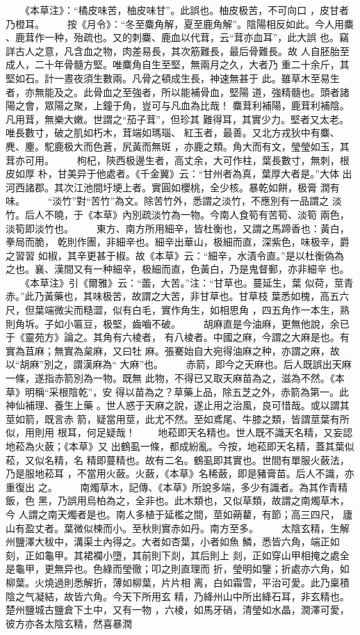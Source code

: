 \documentclass{ctexart}
\begin{document}
　　《本草注》：``橘皮味苦，柚皮味甘''。此誤也。柚皮极苦，不可向口 ，皮甘者乃橙耳。 　　按《月令》：``冬至麋角解，夏至鹿角解''。陰陽相反如此。今人用麋 、鹿茸作一种，殆疏也。又的刺麋、鹿血以代茸，云``茸亦血耳''，此大誤 也。竊詳古人之意，凡含血之物，肉差易長，其次筋難長，最后骨難長。故 人自胚胎至成人，二十年骨髓方堅。唯麋角自生至堅，無兩月之久，大者乃 重二十余斤，其堅如石。計一晝夜須生數兩。凡骨之頓成生長，神速無甚于 此。雖草木至易生者，亦無能及之。此骨血之至強者，所以能補骨血，堅陽 道，強精髓也。頭者諸陽之會，眾陽之聚，上鐘于角，豈可与凡血為比哉！ 麋茸利補陽，鹿茸利補陰。凡用茸，無樂大嫩。世謂之``茄子茸''，但珍其 難得耳，其實少力。堅者又太老。唯長數寸，破之肌如朽木，茸端如瑪瑙、 紅玉者，最善。又北方戎狄中有麋、麂、麈。駝鹿极大而色蒼，尻黃而無斑 ，亦鹿之類。角大而有文，瑩瑩如玉，其茸亦可用。 　　枸杞，陝西极邊生者，高丈余，大可作柱，葉長數寸，無刺，根皮如厚 朴，甘美异于他處者。《千金翼》云：``甘州者為真，葉厚大者是。''大体 出河西諸郡。其次江池間圩埂上者。實圓如櫻桃，全少核。暴乾如餅，极膏 潤有味。 　　``淡竹''對``苦竹''為文。除苦竹外，悉謂之淡竹，不應別有一品謂之 淡竹。后人不曉，于《本草》內別疏淡竹為一物。今南人食筍有苦筍、淡筍 兩色，淡筍即淡竹也。 　　東方、南方所用細辛，皆杜衡也，又謂之馬蹄香也：黃白，拳局而脆， 乾則作團，非細辛也。細辛出華山，极細而直，深紫色，味极辛，爵之習習 如椒，其辛更甚于椒。故《本草》云：``細辛，水漬令直。''是以杜衡偽為 之也。襄、漢間又有一种細辛，极細而直，色黃白，乃是鬼督郵，亦非細辛 也。 　　《本草注》引《爾雅》云：``蘦，大苦。''注：``甘草也。蔓延生，葉 似荷，莖青赤。''此乃黃藥也，其味极苦，故謂之大苦，非甘草也。甘草枝 葉悉如槐，高五六尺，但葉端微尖而糙澀，似有白毛，實作角生，如相思角 ，四五角作一本生，熟則角坼。子如小匾豆，极堅，齒嚙不破。 　　胡麻直是今油麻，更無他說，余已于《靈苑方》論之。其角有六棱者， 有八棱者。中國之麻，今謂之大麻是也。有實為苴麻；無實為枲麻，又曰牡 麻。張騫始自大宛得油麻之种，亦謂之麻，故以``胡麻''別之，謂漢麻為`` 大麻''也。 　　赤箭，即今之天麻也。后人既誤出天麻一條，遂指赤箭別為一物。既無 此物，不得已又取天麻苗為之，滋為不然。《本草》明稱``采根陰乾''，安 得以苗為之？草藥上品，除五芝之外，赤箭為第一。此神仙補理、養生上藥 。世人惑于天麻之說，遂止用之治風，良可惜哉。或以謂其莖如箭，既言赤 箭，疑當用莖，此尤不然。至如鳶尾、牛膝之類，皆謂莖葉有所似，用則用 根耳，何足疑哉！ 　　地菘即天名精也。世人既不識天名精，又妄認地菘為火蘞；《本草》又 出鶴虱一條，都成紛亂。今按，地菘即天名精，蓋其葉似菘，又似名精，名 精即蔓精也。故有二名。鶴虱即其實也。世間有單服火蘞法，乃是服地菘耳 ，不當用火蘞。火蘞，《本草》名稀蘞，即是豬膏苗。后人不識，亦重復出 之。 　　南燭草木，記傳、《本草》所說多端，多少有識者。為其作青精飯，色 黑，乃誤用烏柏為之，全非也。此木類也，又似草類，故謂之南燭草木，今 人謂之南天燭者是也。南人多植于延檻之間，莖如蒴藋，有節；高三四尺， 廬山有盈丈者。葉微似楝而小。至秋則實赤如丹。南方至多。 　　太陰玄精，生解州鹽澤大秡中，溝渠土內得之。大者如杏葉，小者如魚 鱗，悉皆六角，端正如刻，正如龜甲。其裙襴小墮，其前則下剡，其后則上 剡，正如穿山甲相掩之處全是龜甲，更無异也。色綠而瑩徹；叩之則直理而 折，瑩明如鑒；折處亦六角，如柳葉。火燒過則悉解折，薄如柳葉，片片相 离，白如霜雪，平治可愛。此乃稟積陰之气凝結，故皆六角。今天下所用玄 精，乃絳州山中所出絳石耳，非玄精也。楚州鹽城古鹽倉下土中，又有一物 ，六棱，如馬牙硝，清瑩如水晶，潤澤可愛，彼方亦各太陰玄精，然喜暴潤 
\end{document}
